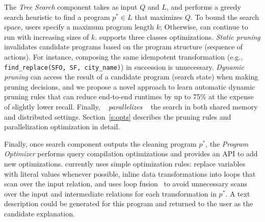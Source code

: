 
The {\it Tree Search} component takes as input $Q$ and $L$, and performs a greedy search heuristic to find a program $p^* \in L$ that maximizes $Q$.    To bound the search space, users specify a maximum program length $k$;  Otherwise, \sys can continue to run with increasing sizes of $k$.    \sys supports three classes optimizations. {\it Static pruning} invalidates candidate programs based on the program structure (sequence of actions).  For instance, composing the same idempotent transformation (e.g., \texttt{find\_replace(SFO, SF, city\_name)}) in succession is unnecessary.  {\it Dynamic pruning} can access the result of a candidate program (search state) when making pruning decisions, and we propose a novel approach to learn automatic dynamic pruning rules that can reduce end-to-end runtimes by up to 75\% at the expense of slightly lower recall. Finally, \sys ~ {\it parallelizes} ~ the search in both shared memory and distributed settings.  Section~\ref{s:opts} describes the pruning rules and parallelization optimization in detail.


Finally, once search component outputs the cleaning program $p^*$, the {\it Program Optimizer} performs query compilation optimizations and provides an API to add new optimizations.  \sys currently uses simple optimization rules: replace variables with literal values whenever possible, inline data transformations into loops that scan over the input relation, and uses loop fusion~\cite{palkar2017weld, crotty2014tupleware} to avoid unnecessary scans over the input and intermediate relations for each transformation in $p^*$.   A text description could be generated for this program and returned to the user as the candidate explanation.

